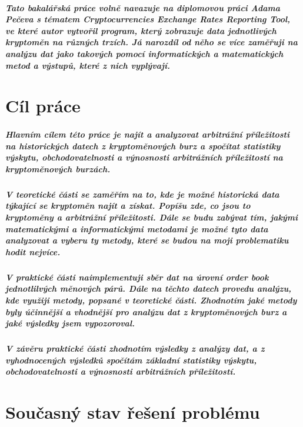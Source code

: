\documentclass[thesis=B,czech]{FITthesis}[2019/03/21]
\begin{document}
\begin{introduction}
\paragraph{
Tato bakalářská práce volně navazuje na diplomovou práci Adama Pečeva s tématem Cryptocurrencies Exchange Rates Reporting Tool, ve které autor vytvořil program, který zobrazuje data jednotlivých kryptoměn na různých trzích. Já narozdíl od něho se více zaměřuji na analýzu dat jako takových pomocí informatických a matematických metod a výstupů, které z nich vyplývají.
}
\end{introduction}

\chapter{Cíl práce}
\paragraph{
Hlavním cílem této práce je najít a analyzovat arbitrážní příležitosti na historických datech z kryptoměnových burz a spočítat statistiky výskytu, obchodovatelnosti a výnosnosti arbitrážních příležitostí na kryptoměnových burzách. 
}
\paragraph{
V teoretické části se zaměřím na to, kde je možné historická data týkající se kryptoměn najít a získat. Popíšu zde, co jsou to kryptoměny a arbitrážní příležitosti. Dále se budu zabývat tím, jakými matematickými a informatickými metodami je možné tyto data analyzovat a vyberu ty metody, které se budou na moji problematiku hodit nejvíce.
}
\paragraph{
V praktické části naimplementuji sběr dat na úrovní order book jednotlilvých měnových párů. Dále na těchto datech provedu analýzu, kde využiji metody, popsané v teoretické části. Zhodnotím jaké metody byly účinnější a vhodnější pro analýzu dat z kryptoměnových burz a jaké výsledky jsem vypozoroval.
}
\paragraph{
V závěru praktické části zhodnotím výsledky z analýzy dat, a z vyhodnocených výsledků spočítám základní statistiky výskytu, obchodovatelnosti a výnosnosti arbitrážních příležitostí. 
}
\chapter{Současný stav řešení problému}
\end{document}
